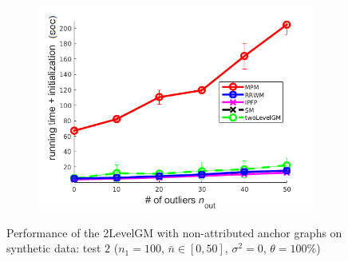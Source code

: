 \begin{figure}
\begin{subfigure}[b]{0.33\textwidth}
		\includegraphics[scale=0.33]{"chapter3/fig/SyntheticTest/no_descr/Results_v4.3.3/Test3/time_summary_avg10t"} 
	\end{subfigure} 	
	\caption[Performance of the 2LevelGM with non-attributed anchor graphs on synthetic data (test $2$)]{Performance of the 2LevelGM with non-attributed anchor graphs on synthetic data: test $2$ ($n_1=100$, $\bar{n}\in[0,50]$, $\sigma^2=0$, $\theta=100\%$)}
	\label{fig:synTest2_ver433}
\end{figure}
